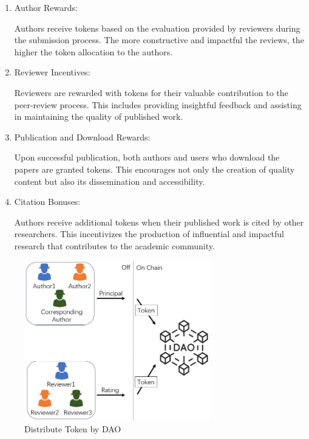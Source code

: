 \documentclass[lettersize,journal]{IEEEtran}
\begin{document}
\begin{enumerate}
  \item Author Rewards:

  Authors receive tokens based on the evaluation provided by reviewers during the submission process. The more constructive and impactful the reviews, the higher the token allocation to the authors.

  \item Reviewer Incentives:
  
  Reviewers are rewarded with tokens for their valuable contribution to the peer-review process. This includes providing insightful feedback and assisting in maintaining the quality of published work.
  
  \item Publication and Download Rewards:
  
  Upon successful publication, both authors and users who download the papers are granted tokens. This encourages not only the creation of quality content but also its dissemination and accessibility.

  \item Citation Bonuses:

  Authors receive additional tokens when their published work is cited by other researchers. This incentivizes the production of influential and impactful research that contributes to the academic community.

\end{enumerate}

\begin{figure}[h]
  \centering
  \includegraphics[width=3.2in]{assets/daopaper.png}
  \caption{Distribute Token by DAO}
  \label{fig:distributetoken}
\end{figure}
\end{document}
